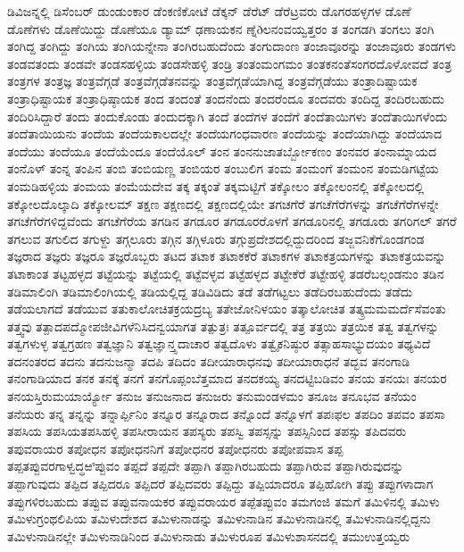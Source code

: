 {ಡಿವಿಜನ್ನಲ್ಲಿ
ಡಿಸೆಂಬರ್
ಡುಂಡುಂಕಾರ
ಡೆಂಕಣಿಕೋಟೆ
ಡೆಕ್ಕನ್
ಡೆರೆಟ್
ಡೆರೆಟ್ರವರು
ಡೊಗರಹಳ್ಳಗಳ
ಡೊಣೆ
ಡೊಣೆಗಳು
ಡೊಣೆಯಿದ್ದು
ಡೊಣೆಯೂ
ಡ್ಯಾಮ್
ಢಣಾಯಕನ
ಣ್ನೆðಲನಂವಯ್ವತ್ತರಂ
ತ
ತಂಗಡಗಿ
ತಂಗಲು
ತಂಗಿ
ತಂಗಿದ್ದ
ತಂಗಿದ್ದು
ತಂಗಿಯ
ತಂಗಿಯನ್ನೇನಾ
ತಂಗಿರಬಹುದೆಂದು
ತಂಗುದಾಂಣ
ತಂಜಾವೂರನ್ನು
ತಂಜಾವೂರು
ತಂಡಗಳು
ತಂಡವತಂದು
ತಂಡವೇ
ತಂಡಸಹಳ್ಳಿಯ
ತಂಡಸೇಹಳ್ಳಿ
ತಂಡ್ರಿ
ತಂತಂಮಂಗಮಂ
ತಂತಕನಂತೆಸಂಗರದೊಳೋವದೆ
ತಂತ್ರ
ತಂತ್ರಗಳ
ತಂತ್ರಜ್ಞ
ತಂತ್ರವೆಗ್ಗಡೆ
ತಂತ್ರವೆಗ್ಗಡೆತನವನ್ನು
ತಂತ್ರವೆಗ್ಗಡೆಯಾಗಿದ್ದ
ತಂತ್ರವೆಗ್ಗಡೆಯು
ತಂತ್ರಾದಿಷ್ಟಾಯಕ
ತಂತ್ರಾಧಿಷ್ಟಾಯಕ
ತಂತ್ರಾಧಿಷ್ಠಾಯಕ
ತಂದ
ತಂದಂತೆ
ತಂದನೆಂದು
ತಂದರೆಂದೂ
ತಂದವರು
ತಂದಿದ್ದ
ತಂದಿರಬಹುದು
ತಂದಿರಿಸಿದ್ದಾರೆ
ತಂದು
ತಂದುಕೊಂಡು
ತಂದುದಕ್ಕಾಗಿ
ತಂದೆ
ತಂದೆಗಳ
ತಂದೆಗೆ
ತಂದೆತಾಯಿಗಳು
ತಂದೆತಾಯಿಗಳೆಂದು
ತಂದೆತಾಯಿಯನು
ತಂದೆಯ
ತಂದೆಯಕಾಲದಲ್ಲೇ
ತಂದೆಯಗಂಧವಾರಣ
ತಂದೆಯನ್ನು
ತಂದೆಯಾಗಿದ್ದು
ತಂದೆಯಾದ
ತಂದೆಯು
ತಂದೆಯೂ
ತಂದೆಯೆಂದೂ
ತಂದೆಯೊಲ್
ತಂನ
ತಂನನುಜಾತರ್ಬ್ಬೋಕಣಂ
ತಂನವರ
ತಂನಾಮ್ನಾಯದ
ತಂನೊಳ್
ತಂನ್ನ
ತಂಪಿನ
ತಂಬಿ
ತಂಬಿಯಣ್ಣ
ತಂಬಿಯರ
ತಂಬುಲಿಗ
ತಂಮ
ತಂಮಂಗೆ
ತಂಮಂನ
ತಂಮಡಿಗಟ್ಟೆಯ
ತಂಮಡಿಹಳ್ಳಿಯ
ತಂಮಯ
ತಂಮೆಯದೇವ
ತಕ್ಕ
ತಕ್ಕಂತೆ
ತಕ್ಕಮಟ್ಟಿಗೆ
ತಕ್ಕೋಲಂ
ತಕ್ಕೋಲಂನಲ್ಲಿ
ತಕ್ಕೋಲದಲ್ಲಿ
ತಕ್ಕೋಲದೊಲ್ಕಾದಿ
ತಕ್ಕೋಲಮ್
ತಕ್ಷಣ
ತಕ್ಷಣದಲ್ಲಿ
ತಕ್ಷಣದಲ್ಲಿಯೇ
ತಗಚಗೆರೆ
ತಗಚೆಗೆರೆಗಳನ್ನು
ತಗಚೆಗೆರೆಗಳನ್ನೇ
ತಗಚೆಗೆರೆಗಳಿದ್ದವೆಂದು
ತಗಚೆಗೆರೆಯ
ತಗಡಿನ
ತಗಡೂರ
ತಗಡೂರರೊಳಗೆ
ತಗಡೂರಿನಲ್ಲಿ
ತಗಡೂರು
ತಗರಿಗಲ್
ತಗರೆ
ತಗಲುವ
ತಗುಲಿದ
ತಗುಳ್ದು
ತಗ್ಗಲೂರು
ತಗ್ಗಿನ
ತಗ್ಗಿಳೂರು
ತಗ್ಗುಪ್ರದೇಶದಲ್ಲಿದ್ದುದರಿಂದ
ತಜ್ಜವನಿಕೆಗೊಂಡಗಂಡ
ತಜ್ಞರಾದ
ತಜ್ಞರು
ತಜ್ಞರೂ
ತಜ್ಞರೊಬ್ಬರು
ತಟದ
ತಟಾಕ
ತಟಾಕಕೆರೆ
ತಟಾಕಗಳ
ತಟಾಕತ್ರಯಗಳನ್ನು
ತಟಾಕತ್ರಯವನ್ನು
ತಟಾಕಾಂತ
ತಟ್ಟಹಳ್ಳದ
ತಟ್ಟೆಯನ್ನು
ತಟ್ಟೆಯಲ್ಲಿ
ತಟ್ಟೆವಳ್ಳವ
ತಟ್ಟೆಹಳ್ಳದ
ತಟ್ಟೇಕೆರೆ
ತಟ್ಟೇಹಳ್ಳಿ
ತಡರೆಬಲ್ಗಂಡನುಂ
ತಡಿನ
ತಡಿಮಾಲಿಂಗಿ
ತಡಿಮಾಲಿಂಗಿಯಲ್ಲಿ
ತಡಿಯಲ್ಲಿದ್ದ
ತಡಿವಿಡಿದು
ತಡೆ
ತಡೆಗಟ್ಟಲು
ತಡೆದಿರಬಹುದೆಂದು
ತಡೆದು
ತಡೆಯಲಾಗದೆ
ತಡೆಯುವ
ತತುಕಾಲೋಚಿತಕ್ರಯದ್ರಬ್ಯ
ತತೇಜೋನಿಳಯಂ
ತತ್ಕಾಲೋಚಿತ
ತತ್ಕ್ರಮಮಮರ್ದೆಸೆವಂತು
ತತ್ತ್ವವು
ತತ್ಪಾದಪದ್ಮೋಪಜೀವಿಗಳೆನಿಸಿದನ್ವಯಾಗತ
ತತ್ಪುತ್ರಃ
ತತ್ಪೂರ್ವದಲ್ಲಿ
ತತ್ರ
ತತ್ರಯಿ
ತತ್ರಯಿಕ
ತತ್ವ
ತತ್ವಗಳನ್ನು
ತತ್ವಗಳುಳ್ಳ
ತತ್ವಗ್ರಹಣ
ತತ್ವಜ್ಞಾನಿ
ತತ್ವಜ್ಞಾನ್ತ್ಸದಾಚಾರ
ತತ್ವದೊಳು
ತತ್ವೈಕನಿಷ್ಠುರ
ತತ್ಸಾಹಸಾಭ್ಯುದಯಂ
ತಥ್ಯವಿದೆ
ತದನಂತರದ
ತದನು
ತದನುಜನ್ಮಾ
ತದಪಿ
ತದಿದಂ
ತದೀಯಾರಾಧನವು
ತದೀಯಾರಾಧನೆ
ತದ್ಭವ
ತನಂಗಾಡಿ
ತನಂಗಾಡಿಯಾದ
ತನಕ
ತನಕ್ಕೆ
ತನಗೆ
ತನಗೊಪ್ಪಂಬೆತ್ತಮಾದ
ತನದಕಯ್ಯ
ತನದಟ್ಟಿಬಡಿವಂ
ತನಯ
ತನಯಃ
ತನಯರ
ತನಯಸ್ತಿರುಮಯಾರ್ಯ್ಯೋ
ತನುಜ
ತನುಜನಾದ
ತನುಜರು
ತನುಮಂಡಳಮಂ
ತನೂಜ
ತನೂಭವ
ತನೆಯಂ
ತನೆಯರು
ತನ್ನ
ತನ್ನನ್ನು
ತನ್ನಾರ್ಪ್ಪಿನಿಂ
ತನ್ನೂರ
ತನ್ನೂರಾದ
ತನ್ನೊಂದೆ
ತನ್ನೊಳಗೆ
ತಪಃಫಲ
ತಪದಿಂ
ತಪವಂ
ತಪಸಾ
ತಪಸಿಯ
ತಪಸಿಯತಪಸಿಹಳ್ಳಿ
ತಪಸೀರಾಯನ
ತಪಸ್ಯರು
ತಪಸ್ವಿ
ತಪಸ್ಸನ್ನು
ತಪಸ್ಸಿನಿಂದ
ತಪಸ್ಸು
ತಪಿದವರು
ತಪುವರಾಯರ
ತಪೋಧನ
ತಪೋಧನನಿಗೆ
ತಪೋಧನರ
ತಪೋಧನರು
ತಪೋಪವಾಸ
ತಪ್ಪ
ತಪ್ಪತಪ್ಪುವರಗಾಳ್ವದ್ಧಱಿಪ್ಪುವಂ
ತಪ್ಪದೆ
ತಪ್ಪದೇ
ತಪ್ಪಾಗಿ
ತಪ್ಪಾಗಿರಬಹುದು
ತಪ್ಪಾಗಿರುವ
ತಪ್ಪಾಗಿರುವುದನ್ನು
ತಪ್ಪಾಗುವುದು
ತಪ್ಪಿದ
ತಪ್ಪಿದರೂ
ತಪ್ಪಿದರೆ
ತಪ್ಪಿದವರು
ತಪ್ಪಿದ್ದು
ತಪ್ಪಿಯಾದರೂ
ತಪ್ಪಿಹೋಗಿ
ತಪ್ಪು
ತಪ್ಪುಗಳಾದಾಗ
ತಪ್ಪುಗಳಿರಬಹುದು
ತಪ್ಪುವ
ತಪ್ಪುವನಾಯಕರ
ತಪ್ಪುವರಾಯರ
ತಪ್ಪೆತಪ್ಪುವಂ
ತಮಗಂಜಿ
ತಮಗೆ
ತಮಿಳಿನಲ್ಲಿ
ತಮಿಳು
ತಮಿಳುಗ್ರಂಥಲಿಪಿಯ
ತಮಿಳುದೇಶದ
ತಮಿಳುನಾಡನ್ನು
ತಮಿಳುನಾಡಿನ
ತಮಿಳುನಾಡಿನಲ್ಲಿ
ತಮಿಳುನಾಡಿನಲ್ಲಿದ್ದನು
ತಮಿಳುನಾಡಿನಲ್ಲೇ
ತಮಿಳುನಾಡಿನಿಂದ
ತಮಿಳುನಾಡು
ತಮಿಳುರೂಪ
ತಮಿಳುಶಾಸನದಲ್ಲಿ
ತಮುಉತ್ತಯ್ವರು
}
